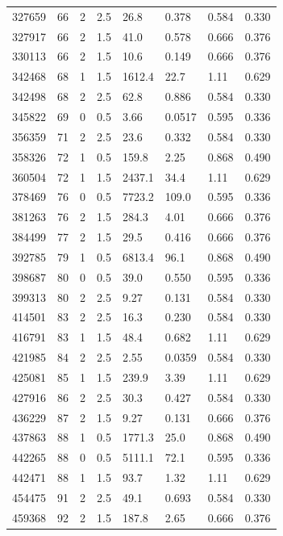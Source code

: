 \documentclass[preview]{standalone}
\begin{document}
{{{\begin{tabular}{L{1.2cm}C{1.2cm} C{0.3cm}C{0.5cm} C{1.4cm}C{1.4cm} C{1.4cm}C{1.4cm}}
  327659  &    66  & 2     & 2.5 &  26.8  & 0.378  & 0.584 &  0.330   \\ 
  327917  &    66  & 2     & 1.5 &  41.0  & 0.578  & 0.666 &  0.376   \\ 
  330113  &    66  & 2     & 1.5 &  10.6  & 0.149  & 0.666 &  0.376   \\ 
  342468  &    68  & 1     & 1.5 &  1612.4  & 22.7  & 1.11 &  0.629   \\ 
  342498  &    68  & 2     & 2.5 &  62.8  & 0.886  & 0.584 &  0.330   \\ 
  345822  &    69  & 0     & 0.5 &  3.66  & 0.0517  & 0.595 &  0.336   \\ 
  356359  &    71  & 2     & 2.5 &  23.6  & 0.332  & 0.584 &  0.330   \\ 
  358326  &    72  & 1     & 0.5 &  159.8  & 2.25  & 0.868 &  0.490   \\ 
  360504  &    72  & 1     & 1.5 &  2437.1  & 34.4  & 1.11 &  0.629   \\ 
  378469  &    76  & 0     & 0.5 &  7723.2  & 109.0  & 0.595 &  0.336   \\ 
  381263  &    76  & 2     & 1.5 &  284.3  & 4.01  & 0.666 &  0.376   \\ 
  384499  &    77  & 2     & 1.5 &  29.5  & 0.416  & 0.666 &  0.376   \\ 
  392785  &    79  & 1     & 0.5 &  6813.4  & 96.1  & 0.868 &  0.490   \\ 
  398687  &    80  & 0     & 0.5 &  39.0  & 0.550  & 0.595 &  0.336   \\ 
  399313  &    80  & 2     & 2.5 &  9.27  & 0.131  & 0.584 &  0.330   \\ 
  414501  &    83  & 2     & 2.5 &  16.3  & 0.230  & 0.584 &  0.330   \\ 
  416791  &    83  & 1     & 1.5 &  48.4  & 0.682  & 1.11 &  0.629   \\ 
  421985  &    84  & 2     & 2.5 &  2.55  & 0.0359  & 0.584 &  0.330   \\ 
  425081  &    85  & 1     & 1.5 &  239.9  & 3.39  & 1.11 &  0.629   \\ 
  427916  &    86  & 2     & 2.5 &  30.3  & 0.427  & 0.584 &  0.330   \\ 
  436229  &    87  & 2     & 1.5 &  9.27  & 0.131  & 0.666 &  0.376   \\ 
  437863  &    88  & 1     & 0.5 &  1771.3  & 25.0  & 0.868 &  0.490   \\ 
  442265  &    88  & 0     & 0.5 &  5111.1  & 72.1  & 0.595 &  0.336   \\ 
  442471  &    88  & 1     & 1.5 &  93.7  & 1.32  & 1.11 &  0.629   \\ 
  454475  &    91  & 2     & 2.5 &  49.1  & 0.693  & 0.584 &  0.330   \\ 
  459368  &    92  & 2     & 1.5 &  187.8  & 2.65  & 0.666 &  0.376   \\ 
\hline 
\end{tabular} 

}}}
\end{document}

